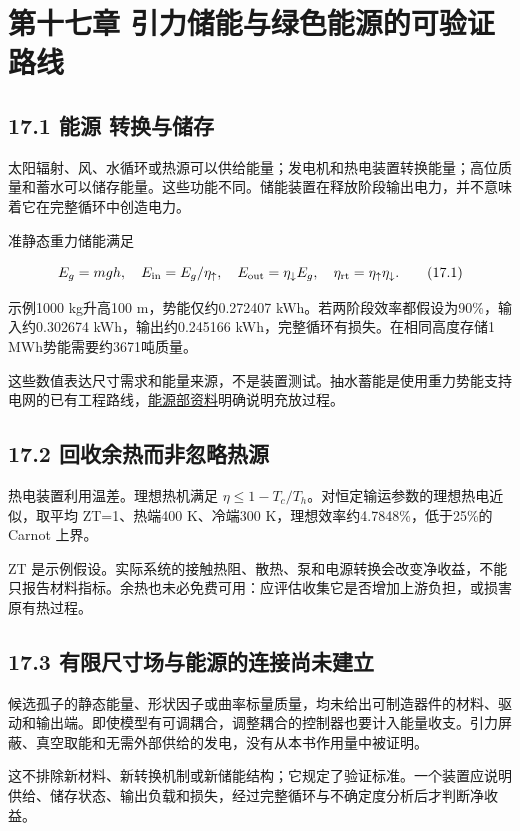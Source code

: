 \documentclass[UTF8,fontset=fandol,11pt]{ctexart}
\begin{document}
\section*{第十七章 引力储能与绿色能源的可验证路线}

\subsection*{17.1 能源 转换与储存}

太阳辐射、风、水循环或热源可以供给能量；发电机和热电装置转换能量；高位质量和蓄水可以储存能量。这些功能不同。储能装置在释放阶段输出电力，并不意味着它在完整循环中创造电力。

准静态重力储能满足

\[
E_g=mgh,\quad E_{\rm in}=E_g/\eta_\uparrow,
\quad E_{\rm out}=\eta_\downarrow E_g,
\quad\eta_{\rm rt}=\eta_\uparrow\eta_\downarrow.
\tag{17.1}
\]

示例1000 kg升高100 m，势能仅约0.272407 kWh。若两阶段效率都假设为90\%，输入约0.302674 kWh，输出约0.245166 kWh，完整循环有损失。在相同高度存储1 MWh势能需要约3671吨质量。

这些数值表达尺寸需求和能量来源，不是装置测试。抽水蓄能是使用重力势能支持电网的已有工程路线，\href{https://www.energy.gov/cmei/water/how-pumped-storage-hydropower-works}{能源部资料}明确说明充放过程。

\subsection*{17.2 回收余热而非忽略热源}

热电装置利用温差。理想热机满足 \(\eta\leq1-T_c/T_h\)。对恒定输运参数的理想热电近似，取平均 ZT=1、热端400 K、冷端300 K，理想效率约4.7848\%，低于25\%的 Carnot 上界。

ZT 是示例假设。实际系统的接触热阻、散热、泵和电源转换会改变净收益，不能只报告材料指标。余热也未必免费可用：应评估收集它是否增加上游负担，或损害原有热过程。

\subsection*{17.3 有限尺寸场与能源的连接尚未建立}

候选孤子的静态能量、形状因子或曲率标量质量，均未给出可制造器件的材料、驱动和输出端。即使模型有可调耦合，调整耦合的控制器也要计入能量收支。引力屏蔽、真空取能和无需外部供给的发电，没有从本书作用量中被证明。

这不排除新材料、新转换机制或新储能结构；它规定了验证标准。一个装置应说明供给、储存状态、输出负载和损失，经过完整循环与不确定度分析后才判断净收益。
\end{document}
